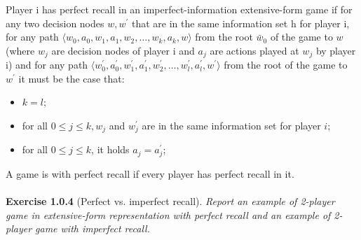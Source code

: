 Player i has perfect recall in an imperfect-information extensive-form game if for any two decision nodes $ w, w^{\prime} $ that are in the same information set h for player i, for any path $ \langle w_{0}, a_{0}, w_{1}, a_{1}, w_{2}, \ldots, w_{k}, a_{k}, w \rangle $ from the root $\bar{w}_{0}$ of the game to $w$ (where $w_{j}$ are decision nodes of player i and $a_{j}$ are actions played at $w_{j}$ by player i) and for any path $ \langle w_{0}^{\prime}, a_{0}^{\prime}, w_{1}^{\prime}, a_{1}^{\prime}, w_{2}^{\prime}, \ldots, w_{l}^{\prime}, a_{l}^{\prime}, w^{\prime} \rangle $ from the root of
the game to $ w^{\prime} $ it must be the case that:
\begin{itemize}
\item $ k = l $;
\item for all $ 0 \leqslant j \leqslant k, w_{j} $ and $ w_{j}^{\prime} $ are in the same information set for player $ i $;
\item for all $ 0 \leqslant j \leqslant k $, it holds $ a_{j}=a_{j}^{\prime} $;
\end{itemize}
A game is with perfect recall if every player has perfect recall in it.\\\\
\textbf{Exercise 1.0.4} (Perfect vs. imperfect recall). \textit{Report an example of 2-player game in extensive-form representation
with perfect recall and an example of 2-player game with imperfect recall.}
